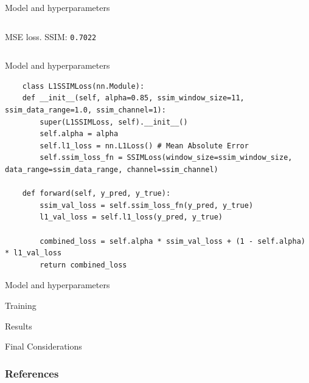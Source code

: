 \documentclass[8pt]{beamer}
\begin{document}
\begin{frame}{Model and hyperparameters}
\begin{columns}
            \newline
            \centering \small MSE loss. SSIM: \texttt{0.7022}
    \end{columns}
\end{frame}

\begin{frame}[fragile]{Model and hyperparameters}
    \begin{lstlisting}
    class L1SSIMLoss(nn.Module):
    def __init__(self, alpha=0.85, ssim_window_size=11, ssim_data_range=1.0, ssim_channel=1):
        super(L1SSIMLoss, self).__init__()
        self.alpha = alpha
        self.l1_loss = nn.L1Loss() # Mean Absolute Error
        self.ssim_loss_fn = SSIMLoss(window_size=ssim_window_size, data_range=ssim_data_range, channel=ssim_channel)

    def forward(self, y_pred, y_true):
        ssim_val_loss = self.ssim_loss_fn(y_pred, y_true)
        l1_val_loss = self.l1_loss(y_pred, y_true)
        
        combined_loss = self.alpha * ssim_val_loss + (1 - self.alpha) * l1_val_loss
        return combined_loss
    \end{lstlisting}
\end{frame}

\begin{frame}{Model and hyperparameters}
\end{frame}

\begin{frame}{Training}
\end{frame}

\begin{frame}{Results}
\end{frame}

\begin{frame}{Final Considerations}
\end{frame}

\begin{frame}
    \frametitle{References}
    \printbibliography
\end{frame}
\end{document}
